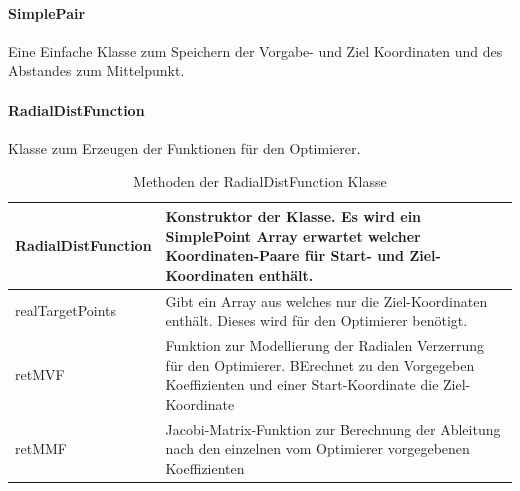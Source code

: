 \paragraph{SimplePair}
Eine Einfache Klasse zum Speichern der Vorgabe- und Ziel Koordinaten und des Abstandes zum Mittelpunkt.

\paragraph{RadialDistFunction}
Klasse zum Erzeugen der Funktionen für den Optimierer.

\begin{table}[H]
\begin{tabular}{p{} | p{}} 
RadialDistFunction & Konstruktor der Klasse. Es wird ein SimplePoint Array erwartet welcher Koordinaten-Paare für Start- und Ziel-Koordinaten enthält.\\ \hline
realTargetPoints & Gibt ein Array aus welches nur die Ziel-Koordinaten enthält. Dieses wird für den Optimierer benötigt.\\ \hline
retMVF & Funktion zur Modellierung der Radialen Verzerrung für den Optimierer. BErechnet zu den Vorgegeben Koeffizienten und einer Start-Koordinate die Ziel-Koordinate\\ \hline
retMMF & Jacobi-Matrix-Funktion zur Berechnung der Ableitung nach den einzelnen vom Optimierer vorgegebenen Koeffizienten \\ 
\end{tabular}
\caption{Methoden der RadialDistFunction Klasse}
\end{table}

